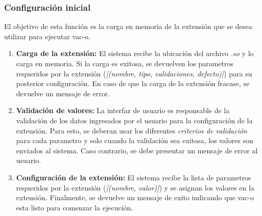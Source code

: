 \documentclass[10pt,a4paper]{article}
\begin{document}
  \subsubsection{Configuraci\'on inicial}
  El objetivo de esta funci\'on es la carga en memoria de la extensi\'on que se desea utilizar para ejecutar vac-o.
  \begin{enumerate}
    \item \textbf{Carga de la extensi\'on:}
    El sistema recibe la ubicaci\'on del archivo \textit{.so} y lo carga en memoria. Si la carga es exitosa, se devuelven los parametros requeridos por la extensi\'on (\textit{[(nombre, tipo, validaciones, defecto)]}) para su posterior configuraci\'on. En caso de que la carga de la extensi\'on fracase, se devuelve un mensaje de error.
    
    \item \textbf{Validaci\'on de valores:}
    La interfaz de usuario es responsable de la validaci\'on de los datos ingresados por el usuario para la configuraci\'on de la extensi\'on. Para esto, se deberan usar los diferentes \textit{criterios de validaci\'on} para cada parametro y solo cuando la validaci\'on sea exitosa, los valores son enviados al sistema. Caso contrario, se debe presentar un mensaje de error al usuario.
    
    \item \textbf{Configuraci\'on de la extensi\'on:}
    El sistema recibe la lista de parametros requeridos por la extensi\'on (\textit{[(nombre, valor)]}) y se asignan los valores en la extensi\'on. Finalmente, se devuelve un mensaje de exito indicando que vac-o esta listo para comenzar la ejecuci\'on.
  \end{enumerate}
\end{document}
